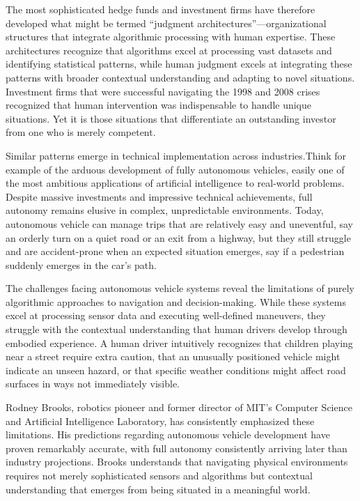 \documentclass[
  Letterpaper,
]{scrbook}
\begin{document}
The most sophisticated hedge funds and investment firms have therefore
developed what might be termed ``judgment
architectures''---organizational structures that integrate algorithmic
processing with human expertise. These architectures recognize that
algorithms excel at processing vast datasets and identifying statistical
patterns, while human judgment excels at integrating these patterns with
broader contextual understanding and adapting to novel situations.
Investment firms that were successful navigating the 1998 and 2008
crises recognized that human intervention was indispensable to handle
unique situations. Yet it is those situations that differentiate an
outstanding investor from one who is merely competent.

Similar patterns emerge in technical implementation across
industries.Think for example of the arduous development of fully
autonomous vehicles, easily one
of the most ambitious applications of artificial intelligence to
real-world problems. Despite massive investments and impressive
technical achievements, full autonomy remains elusive in complex,
unpredictable environments. Today, autonomous vehicle can manage trips
that are relatively easy and uneventful, say an orderly turn on a quiet
road or an exit from a highway, but they still struggle and are
accident-prone when an expected situation emerges, say if a pedestrian
suddenly emerges in the car's path.

The challenges facing autonomous vehicle systems reveal the limitations
of purely algorithmic approaches to navigation and
decision-making. While these systems
excel at processing sensor data and executing well-defined maneuvers,
they struggle with the contextual understanding that human drivers
develop through embodied experience. A human driver intuitively
recognizes that children playing near a street require extra caution,
that an unusually positioned vehicle might indicate an unseen hazard, or
that specific weather conditions might affect road surfaces in ways not
immediately visible.

Rodney Brooks, robotics pioneer and former director of MIT's Computer
Science and Artificial Intelligence Laboratory, has consistently
emphasized these limitations. His predictions regarding autonomous
vehicle development have proven remarkably accurate, with full autonomy
consistently arriving later than industry projections. Brooks
understands that navigating physical environments requires not merely
sophisticated sensors and algorithms but contextual understanding that
emerges from being situated in a meaningful world.
\end{document}
